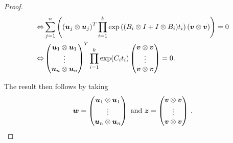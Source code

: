 \begin{proof}
\begin{align*}
\Leftrightarrow &\sum \limits_{j=1}^{n} \left( \left( \boldsymbol{u}_{j} \otimes \boldsymbol{u}_{j} \right)^{T} \prod \limits_{i=1}^{k} \exp\left((B_{i} \otimes I + I \otimes B_{i}) t_{i} \right) \left( \boldsymbol{v} \otimes \boldsymbol{v} \right) \right) = 0 \\
\Leftrightarrow &\begin{pmatrix} \boldsymbol{u}_{1} \otimes \boldsymbol{u}_{1} \\ \vdots \\ \boldsymbol{u}_{n} \otimes \boldsymbol{u}_{n} \end{pmatrix}^{T} \prod \limits_{i=1}^{k} \exp( C_{i} t_{i} ) \begin{pmatrix} \boldsymbol{v} \otimes \boldsymbol{v} \\ \vdots \\ \boldsymbol{v} \otimes \boldsymbol{v} \end{pmatrix} = 0 .
\end{align*}

The result then follows by taking
\begin{equation*}
  \boldsymbol{w} = \begin{pmatrix} \boldsymbol{u}_{1} \otimes \boldsymbol{u}_{1} \\ \vdots \\ \boldsymbol{u}_{n} \otimes \boldsymbol{u}_{n} \end{pmatrix}
  \mbox{ and } \boldsymbol{z} = \begin{pmatrix} \boldsymbol{v} \otimes \boldsymbol{v} \\ \vdots \\ \boldsymbol{v} \otimes \boldsymbol{v} \end{pmatrix} \, .
\end{equation*}
\end{proof}
